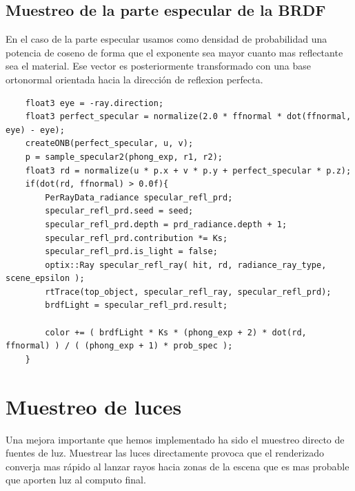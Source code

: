 \clearpage

\subsection{Muestreo de la parte especular de la BRDF}

En el caso de la parte especular usamos como densidad de probabilidad una potencia de coseno de forma que el exponente sea mayor cuanto mas reflectante sea el material. Ese vector es posteriormente transformado con una base ortonormal orientada hacia la dirección de reflexion perfecta.

\begin{lstlisting}
	float3 eye = -ray.direction;
	float3 perfect_specular = normalize(2.0 * ffnormal * dot(ffnormal, eye) - eye);
	createONB(perfect_specular, u, v);
	p = sample_specular2(phong_exp, r1, r2);
	float3 rd = normalize(u * p.x + v * p.y + perfect_specular * p.z);
	if(dot(rd, ffnormal) > 0.0f){
		PerRayData_radiance specular_refl_prd;
		specular_refl_prd.seed = seed;
		specular_refl_prd.depth = prd_radiance.depth + 1;
		specular_refl_prd.contribution *= Ks;
		specular_refl_prd.is_light = false;
		optix::Ray specular_refl_ray( hit, rd, radiance_ray_type, scene_epsilon );
		rtTrace(top_object, specular_refl_ray, specular_refl_prd);
		brdfLight = specular_refl_prd.result;
				
		color += ( brdfLight * Ks * (phong_exp + 2) * dot(rd, ffnormal) ) / ( (phong_exp + 1) * prob_spec );
	}

\end{lstlisting}

\clearpage

\section{Muestreo de luces}

Una mejora importante que hemos implementado ha sido el muestreo directo de fuentes de luz. Muestrear las luces directamente provoca que el renderizado converja mas rápido al lanzar rayos hacia zonas de la escena que es mas probable que aporten luz al computo final.

